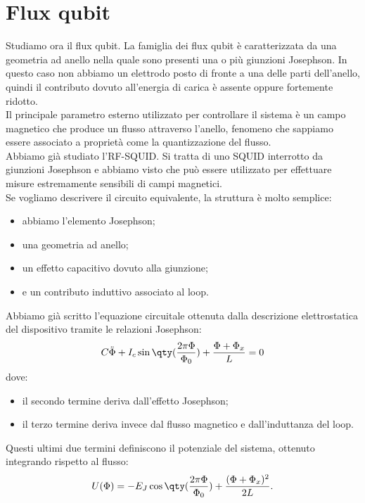 \section{Flux qubit}
Studiamo ora il flux qubit. La famiglia dei flux qubit è caratterizzata da una geometria ad anello nella quale sono presenti una o più giunzioni Josephson. In questo caso non abbiamo un elettrodo posto di fronte a una delle parti dell'anello, quindi il contributo dovuto all'energia di carica è assente oppure fortemente ridotto.\\
Il principale parametro esterno utilizzato per controllare il sistema è un campo magnetico che produce un flusso attraverso l'anello, fenomeno che sappiamo essere associato a proprietà come la quantizzazione del flusso.\\
Abbiamo già studiato l'RF-SQUID. Si tratta di uno SQUID interrotto da giunzioni Josephson e abbiamo visto che può essere utilizzato per effettuare misure estremamente sensibili di campi magnetici.\\
Se vogliamo descrivere il circuito equivalente, la struttura è molto semplice:
\begin{itemize}[leftmargin=0.5cm]
    \item abbiamo l'elemento Josephson;
    \item una geometria ad anello;
    \item un effetto capacitivo dovuto alla giunzione;
    \item e un contributo induttivo associato al loop.
\end{itemize}
Abbiamo già scritto l'equazione circuitale ottenuta dalla descrizione elettrostatica del dispositivo tramite le relazioni Josephson:
\begin{equation*}
    C \ddot{\Phi}
    +
    I_c \sin{
        \qty(
            \frac{2\pi\Phi}{\Phi_0}
        )
    }
    +
    \frac{\Phi+\Phi_x}{L}
    =
    0
\end{equation*}
dove:
\begin{itemize}[leftmargin=0.5cm]
    \item il secondo termine deriva dall'effetto Josephson;
    \item il terzo termine deriva invece dal flusso magnetico e dall'induttanza del loop.
\end{itemize}
Questi ultimi due termini definiscono il potenziale del sistema, ottenuto integrando rispetto al flusso:
\begin{equation*}
    U(\Phi)
    =
    -E_J \cos{
        \qty(
            \frac{2\pi\Phi}{\Phi_0}
        )
    }
    +
    \frac{(\Phi+\Phi_x)^2}{2L}.
\end{equation*}
